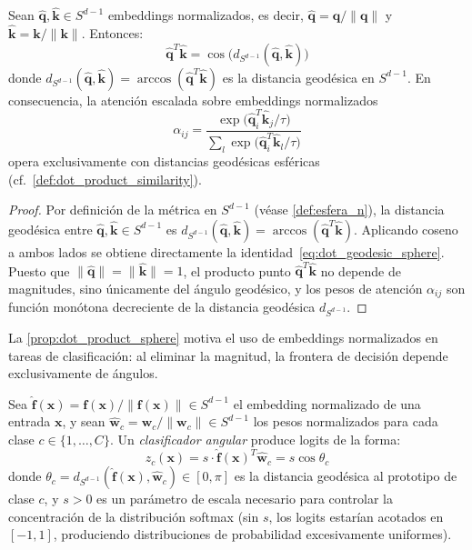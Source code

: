 \begin{proposition}\label{prop:dot_product_sphere}
Sean $\hat{\mathbf{q}}, \hat{\mathbf{k}} \in S^{d-1}$ embeddings normalizados, es decir, $\hat{\mathbf{q}} = \mathbf{q}/\|\mathbf{q}\|$ y $\hat{\mathbf{k}} = \mathbf{k}/\|\mathbf{k}\|$. Entonces:
\begin{equation}
\hat{\mathbf{q}}^T \hat{\mathbf{k}} = \cos\bigl(d_{S^{d-1}}(\hat{\mathbf{q}}, \hat{\mathbf{k}})\bigr)
\label{eq:dot_geodesic_sphere}
\end{equation}
donde $d_{S^{d-1}}(\hat{\mathbf{q}}, \hat{\mathbf{k}}) = \arccos(\hat{\mathbf{q}}^T \hat{\mathbf{k}})$ es la distancia geodésica en $S^{d-1}$. En consecuencia, la atención escalada sobre embeddings normalizados
\[
\alpha_{ij} = \frac{\exp\bigl(\hat{\mathbf{q}}_i^T \hat{\mathbf{k}}_j / \tau\bigr)}{\sum_l \exp\bigl(\hat{\mathbf{q}}_i^T \hat{\mathbf{k}}_l / \tau\bigr)}
\]
opera exclusivamente con distancias geodésicas esféricas (cf.\ \autoref{def:dot_product_similarity}).
\end{proposition}

\begin{proof}
Por definición de la métrica en $S^{d-1}$ (véase \autoref{def:esfera_n}), la distancia geodésica entre $\hat{\mathbf{q}}, \hat{\mathbf{k}} \in S^{d-1}$ es $d_{S^{d-1}}(\hat{\mathbf{q}}, \hat{\mathbf{k}}) = \arccos(\hat{\mathbf{q}}^T \hat{\mathbf{k}})$. Aplicando coseno a ambos lados se obtiene directamente la identidad~\eqref{eq:dot_geodesic_sphere}. Puesto que $\|\hat{\mathbf{q}}\| = \|\hat{\mathbf{k}}\| = 1$, el producto punto $\hat{\mathbf{q}}^T \hat{\mathbf{k}}$ no depende de magnitudes, sino únicamente del ángulo geodésico, y los pesos de atención $\alpha_{ij}$ son función monótona decreciente de la distancia geodésica $d_{S^{d-1}}$.
\end{proof}

La \autoref{prop:dot_product_sphere} motiva el uso de embeddings normalizados en tareas de clasificación: al eliminar la magnitud, la frontera de decisión depende exclusivamente de ángulos.

\begin{definition}\label{def:clasificador_angular}
Sea $\hat{\mathbf{f}}(\mathbf{x}) = \mathbf{f}(\mathbf{x})/\|\mathbf{f}(\mathbf{x})\| \in S^{d-1}$ el embedding normalizado de una entrada $\mathbf{x}$, y sean $\hat{\mathbf{w}}_c = \mathbf{w}_c/\|\mathbf{w}_c\| \in S^{d-1}$ los pesos normalizados para cada clase $c \in \{1, \ldots, C\}$. Un \textit{clasificador angular} \citep{wang2017normface} produce logits de la forma:
\begin{equation}
z_c(\mathbf{x}) = s \cdot \hat{\mathbf{f}}(\mathbf{x})^T \hat{\mathbf{w}}_c = s \cos\theta_c
\label{eq:clasificador_angular}
\end{equation}
donde $\theta_c = d_{S^{d-1}}(\hat{\mathbf{f}}(\mathbf{x}), \hat{\mathbf{w}}_c) \in [0, \pi]$ es la distancia geodésica al prototipo de clase $c$, y $s > 0$ es un parámetro de escala necesario para controlar la concentración de la distribución softmax (sin $s$, los logits estarían acotados en $[-1, 1]$, produciendo distribuciones de probabilidad excesivamente uniformes).
\end{definition}

